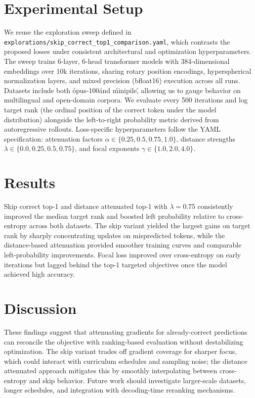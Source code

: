 \documentclass{article}
\begin{document}
\section{Experimental Setup}
We reuse the exploration sweep defined in \texttt{explorations/skip\_correct\_top1\_comparison.yaml}, which contrasts the proposed losses under consistent architectural and optimization hyperparameters.
The sweep trains 6-layer, 6-head transformer models with 384-dimensional embeddings over 10k iterations, sharing rotary position encodings, hyperspherical normalization layers, and mixed precision (bfloat16) execution across all runs.
Datasets include both \'opus-100\' and \'minipile\', allowing us to gauge behavior on multilingual and open-domain corpora.
We evaluate every 500 iterations and log target rank (the ordinal position of the correct token under the model distribution) alongside the left-to-right probability metric derived from autoregressive rollouts.
Loss-specific hyperparameters follow the YAML specification: attenuation factors $\alpha \in \{0.25, 0.5, 0.75, 1.0\}$, distance strengths $\lambda \in \{0.0, 0.25, 0.5, 0.75\}$, and focal exponents $\gamma \in \{1.0, 2.0, 4.0\}$.

\section{Results}
Skip correct top-1 and distance attenuated top-1 with $\lambda = 0.75$ consistently improved the median target rank and boosted left probability relative to cross-entropy across both datasets.
The skip variant yielded the largest gains on target rank by sharply concentrating updates on mispredicted tokens, while the distance-based attenuation provided smoother training curves and comparable left-probability improvements.
Focal loss improved over cross-entropy on early iterations but lagged behind the top-1 targeted objectives once the model achieved high accuracy.

\section{Discussion}
These findings suggest that attenuating gradients for already-correct predictions can reconcile the objective with ranking-based evaluation without destabilizing optimization.
The skip variant trades off gradient coverage for sharper focus, which could interact with curriculum schedules and sampling noise; the distance attenuated approach mitigates this by smoothly interpolating between cross-entropy and skip behavior.
Future work should investigate larger-scale datasets, longer schedules, and integration with decoding-time reranking mechanisms.
\end{document}
